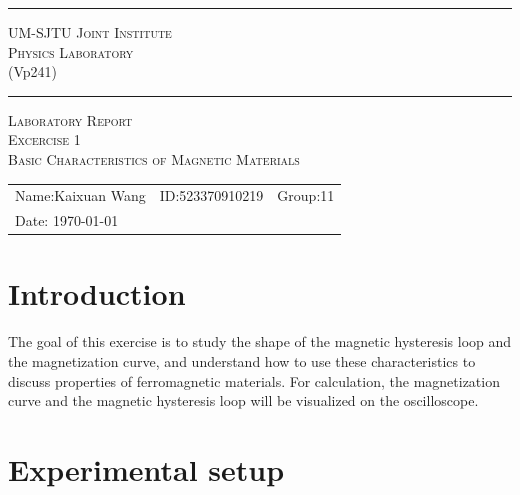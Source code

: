 \documentclass[12pt, a4paper, oneside]{article}
\begin{document}
\begin{center}
	\rule{\textwidth}{1pt}\par
	\vspace{5mm}
	{\large\scshape UM-SJTU Joint Institute}\\[\baselineskip]
	{\large\scshape Physics Laboratory}\\
	(Vp241)
	\rule{\textwidth}{1pt}\par
	\vspace{4cm}
	{\large\scshape Laboratory Report}\\[\baselineskip]
	{\large\scshape Excercise 1}\\[\baselineskip]
	{\large\scshape Basic Characteristics of Magnetic Materials}\\[\baselineskip]
\end{center}
\vspace{7cm}

\begin{tabular}{lll}
	Name:Kaixuan Wang & ID:523370910219 & Group:11 \\
	Date: {\today}    &                 &         \\
\end{tabular}


\rightline{\footnotesize[rev4.1]}
\pagebreak

\section{Introduction}
\indent

The goal of this exercise is to study the shape of the magnetic hysteresis loop and the
magnetization curve, and understand how to use these characteristics to discuss properties
of ferromagnetic materials. For calculation, the magnetization curve and the magnetic hysteresis loop will
be visualized on the oscilloscope. 

\section{Experimental setup}
\indent
\end{document}
